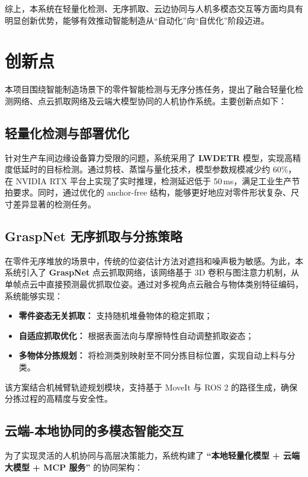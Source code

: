 \documentclass{cumcmthesis}
\begin{document}
综上，本系统在轻量化检测、无序抓取、云边协同与人机多模态交互等方面均具有明显创新优势，能够有效推动智能制造从“自动化”向“自优化”阶段迈进。

\section{创新点}

本项目围绕智能制造场景下的零件智能检测与无序分拣任务，提出了融合轻量化检测网络、点云抓取网络及云端大模型协同的人机协作系统。主要创新点如下：

\subsection{轻量化检测与部署优化}
针对生产车间边缘设备算力受限的问题，系统采用了 \textbf{LWDETR} 模型，实现高精度低延时的目标检测。通过剪枝、蒸馏与量化技术，模型参数规模减少约 60\%，在 NVIDIA RTX 平台上实现了实时推理，检测延迟低于 50\,ms，满足工业生产节拍要求。同时，通过优化的 anchor-free 结构，能够更好地应对零件形状复杂、尺寸差异显著的检测任务。

\subsection{GraspNet 无序抓取与分拣策略}
在零件无序堆放的场景中，传统的位姿估计方法对遮挡和噪声极为敏感。为此，本系统引入了 \textbf{GraspNet} 点云抓取网络，该网络基于 3D 卷积与图注意力机制，从单帧点云中直接预测最优抓取位姿。通过对多视角点云融合与物体类别特征编码，系统能够实现：

\begin{itemize}
    \item \textbf{零件姿态无关抓取：} 支持随机堆叠物体的稳定抓取；
    \item \textbf{自适应抓取优化：} 根据表面法向与摩擦特性自动调整抓取姿态；
    \item \textbf{多物体分拣规划：} 将检测类别映射至不同分拣目标位置，实现自动上料与分类。
\end{itemize}

该方案结合机械臂轨迹规划模块，支持基于 MoveIt 与 ROS 2 的路径生成，确保分拣过程的高精度与安全性。

\subsection{云端-本地协同的多模态智能交互}
为了实现灵活的人机协同与高层决策能力，系统构建了 \textbf{“本地轻量化模型 + 云端大模型 + MCP 服务”} 的协同架构：
\end{document}
